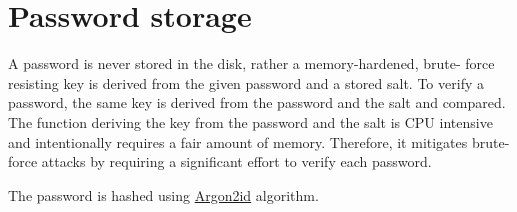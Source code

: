 \section{Password storage}
A password is never stored in the disk, rather a memory-hardened, brute-
force resisting key is derived from the given password and a stored salt. To verify a 
password, the same key is derived from the password and the salt and 
compared.  The function deriving the key from the password and
the salt is CPU intensive and intentionally requires a fair amount of 
memory. Therefore, it mitigates brute-force attacks by requiring a 
significant effort to verify each password. 

The password is hashed using
\href{https://github.com/P-H-C/phc-winner-argon2/raw/master/argon2-specs.pdf}{Argon2id} algorithm. 
